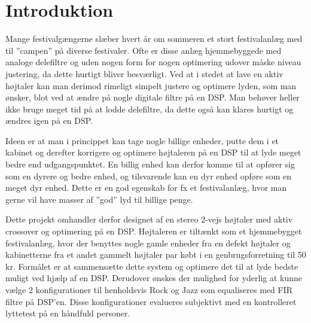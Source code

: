 \section{Introduktion}

Mange festivalgængerne slæber hvert år om sommeren et stort festivalanlæg med til ”campen” på diverse festivaler. Ofte er disse anlæg hjemmebyggede med analoge delefiltre og uden nogen form for nogen optimering udover måske niveau justering, da dette hurtigt bliver besværligt. Ved at i stedet at lave en aktiv højtaler kan man derimod rimeligt simpelt justere og optimere lyden, som man ønsker, blot ved at ændre på nogle digitale filtre på en DSP. Man behøver heller ikke bruge meget tid på at lodde delefiltre, da dette også kan klares hurtigt og ændres igen på en DSP. 

Ideen er at man i princippet kan tage nogle billige enheder, putte dem i et kabinet og derefter korrigere og optimere højtaleren på en DSP til at lyde meget bedre end udgangspunktet. En billig enhed kan derfor komme til at opfører sig som en dyrere og bedre enhed, og tilsvarende kan en dyr enhed opføre som en meget dyr enhed. Dette er en god egenskab for fx et festivalanlæg, hvor man gerne vil have masser af ”god” lyd til billige penge.  

Dette projekt omhandler derfor designet af en stereo 2-vejs højtaler med aktiv crossover og optimering på en DSP. Højtaleren er tiltænkt som et hjemmebygget festivalanlæg, hvor der benyttes nogle gamle enheder fra en defekt højtaler og kabinetterne fra et andet gammelt højtaler par købt i en genbrugsforretning til 50 kr. Formålet er at sammensætte dette system og optimere det til at lyde bedste muligt ved hjælp af en DSP. Derudover ønskes der mulighed for yderlig at kunne vælge 2 konfigurationer til henholdsvis Rock og Jazz som equaliseres med FIR filtre på DSP’en. Disse konfigurationer evalueres subjektivt med en kontrolleret lyttetest på en håndfuld personer.
